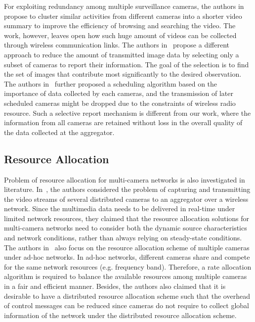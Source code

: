 For exploiting redundancy among multiple surveillance cameras, the authors in~\cite{ClusteredSynopsis} propose to cluster similar activities from different cameras into a shorter video summary to improve the efficiency of browsing and searching the video.
The work, however, leaves open how such huge amount of videos can be collected through wireless communication links.
The authors in~\cite{CameraSelection} propose a different approach to reduce the amount of transmitted image data by selecting only a subset of cameras to report their information.
The goal of the selection is to find the set of images that contribute most significantly to the desired observation.
The authors in~\cite{CorrAwareScheduling} further proposed a scheduling algorithm based on the importance of data collected by each cameras, and the transmission of later scheduled cameras might be dropped due to the constraints of wireless radio resource.
Such a selective report mechanism is different from our work, where the information from all cameras are retained without loss in the overall quality of the data collected at the aggregator.
%
\subsection{Resource Allocation}
Problem of resource allocation for multi-camera networks is also investigated in literature.
%
In~\cite{MWSNresourceAllocation}, the authors considered the problem of capturing and transmitting the video streams of several distributed cameras to an aggregator  over a wireless network.
Since the multimedia data needs to be delivered in real-time under limited network resources, they claimed that the resource allocation solutions for multi-camera networks need to consider both the dynamic source characteristics and network conditions, rather than always relying on steady-state conditions.
%
The authors in~\cite{rateAllocationForVideo} also focus on the resource allocation scheme of multiple cameras under ad-hoc networks.
In ad-hoc networks, different cameras share and compete for the same network resources (e.g. frequency band).
Therefore, a rate allocation algorithm is required to balance the available resources among multiple cameras in a fair and efficient manner.
Besides, the authors also claimed that it is desirable to have a distributed resource allocation scheme such that the overhead of control messages can be reduced since cameras do not require to collect global information of the network under the distributed resource allocation scheme.
%


